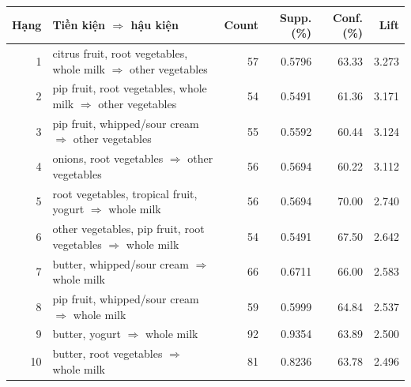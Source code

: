 \begin{tabular}{rp{}rrrr}
\toprule
Hạng & Tiền kiện $\Rightarrow$ hậu kiện & Count & Supp. (\%) & Conf. (\%) & Lift \\
\midrule
1 & citrus fruit, root vegetables, whole milk $\Rightarrow$ other vegetables & 57 & 0.5796 & 63.33 & 3.273 \\
2 & pip fruit, root vegetables, whole milk $\Rightarrow$ other vegetables & 54 & 0.5491 & 61.36 & 3.171 \\
3 & pip fruit, whipped/sour cream $\Rightarrow$ other vegetables & 55 & 0.5592 & 60.44 & 3.124 \\
4 & onions, root vegetables $\Rightarrow$ other vegetables & 56 & 0.5694 & 60.22 & 3.112 \\
5 & root vegetables, tropical fruit, yogurt $\Rightarrow$ whole milk & 56 & 0.5694 & 70.00 & 2.740 \\
6 & other vegetables, pip fruit, root vegetables $\Rightarrow$ whole milk & 54 & 0.5491 & 67.50 & 2.642 \\
7 & butter, whipped/sour cream $\Rightarrow$ whole milk & 66 & 0.6711 & 66.00 & 2.583 \\
8 & pip fruit, whipped/sour cream $\Rightarrow$ whole milk & 59 & 0.5999 & 64.84 & 2.537 \\
9 & butter, yogurt $\Rightarrow$ whole milk & 92 & 0.9354 & 63.89 & 2.500 \\
10 & butter, root vegetables $\Rightarrow$ whole milk & 81 & 0.8236 & 63.78 & 2.496 \\
\bottomrule
\end{tabular}
